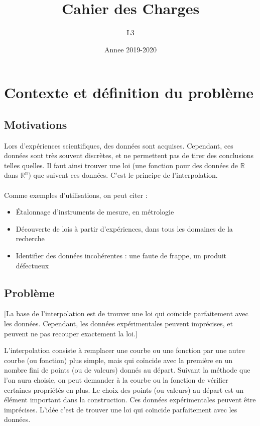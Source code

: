 \documentclass[a4paper,12pt]{article}
\title{Cahier des Charges}
\author{L3}
\date{Annee 2019-2020}
\newcommand{\IKex}[2]{\mathbb{#1}^{#2}}
\newcommand{\IK}[1]{\mathbb{#1}}
\newcommand{\IRex}[1]{\IKex{R}{#1}}
\newcommand{\IR}{\IK{R}}
\begin{document}
\maketitle
\tableofcontents

\newpage

\section{Contexte et définition du problème}

\subsection{Motivations}

Lors d'expériences scientifiques, des données sont acquises. Cependant, ces données sont très souvent discrètes, et ne permettent pas de tirer des conclusions telles quelles. Il faut ainsi trouver une loi (une fonction pour des données de $\IR$ dans $\IRex{n}$) que suivent ces données. C'est le principe de l'interpolation.
\\ \\
Comme exemples d'utilisations, on peut citer :
\begin{itemize}
\item Étalonnage d'instruments de mesure, en métrologie
\item Découverte de lois à partir d'expériences, dans tous les domaines de la recherche
\item Identifier des données incohérentes : une faute de frappe, un produit défectueux
\end{itemize}

\subsection{Problème}

[La base de l'interpolation est de trouver une loi qui coïncide parfaitement avec les données. Cependant, les données expérimentales peuvent imprécises, et peuvent ne pas recouper exactement la loi.]

L’interpolation consiste à remplacer une courbe ou une fonction par une autre courbe (ou fonction) plus simple, mais qui coïncide avec la première en un nombre fini de points (ou de valeurs) donnés au départ. Suivant la méthode que l’on aura choisie, on peut demander à la courbe ou la fonction de vérifier certaines propriétés en plus. Le choix des points (ou valeurs) au départ est un élément important dans la construction.
Ces données expérimentales peuvent être imprécises. L’idée c’est de trouver une loi qui coïncide parfaitement avec les données.
\end{document}
